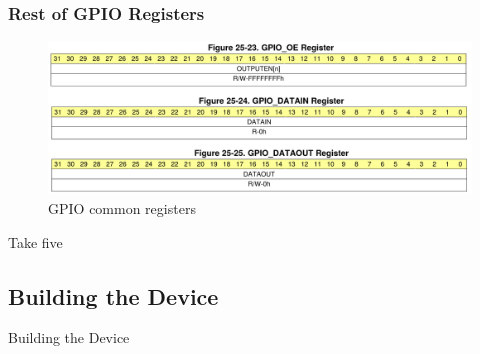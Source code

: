 \documentclass[aspectratio=169,usenames,dvipsnames]{beamer}
\begin{document}
\begin{frame}
  \frametitle{Rest of GPIO Registers}
    \begin{figure}
      \centering
      \includegraphics[scale=0.3]{images/gpio-common-regs.png}
      \caption{GPIO common registers}
  \end{figure}
\end{frame}

\begin{frame}[standout]
  Take five
\end{frame}

\subsection{Building the Device}

\begin{frame}[standout]
  Building the Device
\end{frame}
\end{document}
